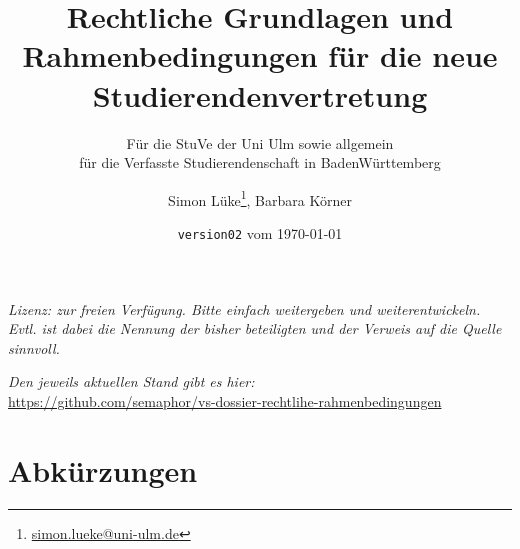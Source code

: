 \documentclass[
10pt,
a4paper,
twoside,								%
titlepage=false,							%
draft=false								%
]{scrartcl}
\begin{document}
\titlehead{\href{http://www.uni-ulm.de/stuve}{StuVe – StudierendenVertretung, uulm}}


\subject{}

\title{Rechtliche Grundlagen und Rahmenbedingungen für die neue Studierendenvertretung}

\subtitle{Für die StuVe der Uni Ulm sowie allgemein\\für die Verfasste Studierendenschaft in BadenWürttemberg}

\author{Simon Lüke\thanks{\href{mailto:simon.lueke@uni-ulm.de}{simon.lueke@uni-ulm.de}}, Barbara Körner}

\date{\texttt{version02} vom \today}


\maketitle
\thispagestyle{empty}

\tableofcontents

\vfill

\begin{center}
	\textit{Lizenz: zur freien Verfügung. Bitte einfach weitergeben und weiterentwickeln. Evtl. ist dabei die Nennung der bisher beteiligten und der Verweis auf die Quelle sinnvoll.}

	\textit{Den jeweils aktuellen Stand gibt es hier:\\}
	\url{https://github.com/semaphor/vs-dossier-rechtlihe-rahmenbedingungen}
\end{center}



\newpage
\thispagestyle{empty}

\section*{Abkürzungen}

\end{document}
